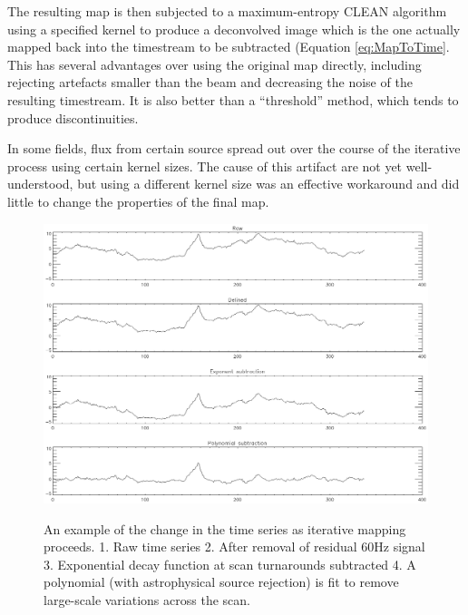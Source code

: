 \documentclass[12pt,preprint]{aastex}
\begin{document}
The resulting map is then subjected to a maximum-entropy CLEAN algorithm
using a specified kernel to produce a deconvolved image
which is the one actually mapped back into the timestream to be
subtracted (Equation \ref{eq:MapToTime}.  This has several advantages
over using the original map directly, including rejecting artefacts
smaller than the beam and decreasing the noise of the resulting
timestream.  It is also better than a ``threshold'' method, which
tends to produce discontinuities.

In some fields, flux from certain source spread out over the course of
the iterative process using certain kernel sizes.  The cause of this
artifact are not yet well-understood, but using a different kernel
size was an effective workaround and did little to change the
properties of the final map.

\setcounter{subfig}{1}
\renewcommand{\thefigure}{\arabic{figure}\alph{subfig}}

\begin{figure}
  \begin{minipage}{6.5in}
    \begin{center}
      \includegraphics[scale=0.9]{iterative_mapping1}
      \caption{An example of the change in the time series as
      iterative mapping proceeds.  1. Raw time series 2. After removal
      of residual 60Hz signal 3. Exponential decay function at scan
      turnarounds subtracted 4. A polynomial (with astrophysical source
      rejection) is fit to remove large-scale variations across the scan. }
    \end{center}
    \label{fig:IterativeMapping}
  \end{minipage}
\end{figure}
\end{document}
